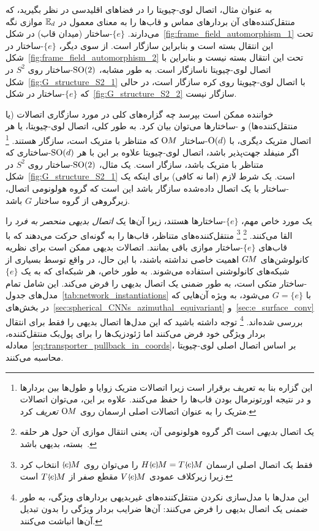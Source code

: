 به عنوان مثال، اتصال لوی-چیویتا را در فضاهای اقلیدسی در نظر بگیرید، که منتقل‌کننده‌های آن بردارهای مماس و قاب‌ها را به معنای معمول در $\mathbb{E}_d$ موازی نگه می‌دارند.
$\{e\}$-ساختار (میدان قاب) در شکل~\ref{fig:frame_field_automorphism_1} تحت این انتقال بسته است و بنابراین سازگار است.
از سوی دیگر، $\{e\}$-ساختار در شکل~\ref{fig:frame_field_automorphism_2} تحت این انتقال بسته نیست و بنابراین با اتصال لوی-چیویتا ناسازگار است.
به طور مشابه، $\operatorname{SO}(2)$-ساختار روی $S^2$ در شکل~\ref{fig:G_structure_S2_1} با اتصال لوی-چیویتا روی کره سازگار است، در حالی که $\{e\}$-ساختار در شکل~\ref{fig:G_structure_S2_2} سازگار نیست.

خواننده ممکن است بپرسد چه گزاره‌های کلی در مورد سازگاری اتصالات (یا منتقل‌کننده‌ها) و -ساختارها می‌توان بیان کرد.
به طور کلی، اتصال لوی-چیویتا، یا هر اتصال متریک دیگری، با $\operatorname{O}(d)$-ساختار $\operatorname{O}\mkern-3.6muM$ که متناظر با متریک است، سازگار هستند.%
\footnote{
	این گزاره بنا به تعریف برقرار است زیرا اتصالات متریک زوایا و طول‌ها بین بردارها و در نتیجه اورتونرمال بودن قاب‌ها را حفظ می‌کنند.
	علاوه بر این، می‌توان اتصالات متریک را به عنوان اتصالات اصلی ارسمان روی $\operatorname{O}\mkern-3.6muM$ \emph{تعریف} کرد.
}
اگر منیفلد جهت‌پذیر باشد، اتصال لوی-چیویتا علاوه بر این با هر $\operatorname{SO}(d)$-ساختاری که متناظر با متریک باشد، سازگار است.
یک مثال، $\operatorname{SO}(2)$-ساختار روی $S^2$ در شکل~\ref{fig:G_structure_S2_1} است.
یک شرط لازم (اما نه کافی) برای اینکه یک -ساختار با یک اتصال داده‌شده سازگار باشد این است که گروه هولونومی اتصال، زیرگروهی از گروه ساختار $G$ باشد.

یک مورد خاص مهم، $\{e\}$-ساختارها هستند، زیرا آن‌ها یک \emph{اتصال بدیهی منحصر به فرد} را القا می‌کنند.%
\footnote{
	یک اتصال \emph{بدیهی} است اگر گروه هولونومی آن، یعنی انتقال موازی آن حول هر حلقه بسته، بدیهی باشد~\cite{craneTrivialConnectionsDiscrete2010}.
}%
\footnote{
	فقط یک اتصال اصلی ارسمان $H\eM = T\eM$ را می‌توان روی $\eM$ انتخاب کرد زیرا زیرکلاف عمودی $V\eM$ مقطع صفر از $T\eM$ است.
}
منتقل‌کننده‌های متناظر، قاب‌ها را به گونه‌ای حرکت می‌دهند که با قاب‌های $\{e\}$-ساختار موازی باقی بمانند.
اتصالات بدیهی ممکن است برای نظریه کانولوشن‌های $G\mkern-1.4muM$ اهمیت خاصی نداشته باشند، با این حال، در واقع توسط بسیاری از شبکه‌های کانولوشنی استفاده می‌شوند.
به طور خاص، هر شبکه‌ای که به یک $\{e\}$-ساختار متکی است، به طور ضمنی یک اتصال بدیهی را فرض می‌کند.
این شامل تمام مدل‌های جدول~\ref{tab:network_instantiations} با $G=\{e\}$ می‌شود، به ویژه آن‌هایی که در بخش‌های~\ref{sec:spherical_CNNs_azimuthal_equivariant} و~\ref{sec:e_surface_conv} بررسی شده‌اند.%
\footnote{
	این مدل‌ها با مدل‌سازی نکردن منتقل‌کننده‌های غیربدیهی بردارهای ویژگی، به طور \emph{ضمنی} یک اتصال بدیهی را فرض می‌کنند:
	آن‌ها ضرایب بردار ویژگی را بدون تبدیل آن‌ها انباشت می‌کنند.
}
توجه داشته باشید که این مدل‌ها اتصال بدیهی را فقط برای انتقال بردار ویژگی خود فرض می‌کنند اما ژئودزیک‌ها را برای پول‌بک منتقل‌کننده، معادله~\eqref{eq:transporter_pullback_in_coords}، بر اساس اتصال اصلی لوی-چیویتا محاسبه می‌کنند.



